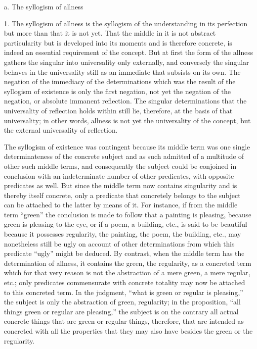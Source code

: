 a. The syllogism of allness

1. The syllogism of allness is
the syllogism of the understanding in its perfection
but more than that it is not yet.
That the middle in it is not abstract particularity
but is developed into its moments
and is therefore concrete,
is indeed an essential requirement of the concept.
But at first the form of the allness
gathers the singular into universality only externally,
and conversely the singular behaves in the universality
still as an immediate that subsists on its own.
The negation of the immediacy of the determinations
which was the result of the syllogism of existence is
only the first negation, not yet the negation of the negation,
or absolute immanent reflection.
The singular determinations that
the universality of reflection holds within still lie,
therefore, at the basis of that universality;
in other words, allness is not yet the universality of the concept,
but the external universality of reflection.

The syllogism of existence was contingent
because its middle term was
one single determinateness of the concrete subject
and as such admitted of a multitude of other such middle terms,
and consequently the subject could be conjoined
in conclusion with an indeterminate number of other predicates,
with opposite predicates as well.
But since the middle term now contains singularity
and is thereby itself concrete,
only a predicate that concretely belongs to
the subject can be attached to the latter by means of it.
For instance, if from the middle term “green”
the conclusion is made to follow that a painting is pleasing,
because green is pleasing to the eye,
or if a poem, a building, etc., is said to be beautiful
because it possesses regularity,
the painting, the poem, the building, etc.,
may nonetheless still be ugly on
account of other determinations
from which this predicate “ugly” might be deduced.
By contrast, when the middle term has the determination of allness,
it contains the green, the regularity, as a concreted term
which for that very reason is not
the abstraction of a mere green, a mere regular, etc.;
only predicates commensurate with concrete totality
may now be attached to this concreted term.
In the judgment, “what is green or regular is pleasing,”
the subject is only the abstraction of green, regularity;
in the proposition, “all things green or regular are pleasing,”
the subject is on the contrary all actual concrete things
that are green or regular things, therefore,
that are intended as concreted with all the properties
that they may also have besides the green or the regularity.

